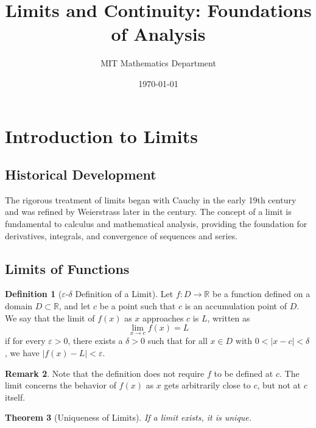 \documentclass[12pt,a4paper]{article}
\title{Limits and Continuity: Foundations of Analysis}
\author{MIT Mathematics Department}
\date{\today}
\theoremstyle{plain}
\newtheorem{theorem}{Theorem}[section]
\theoremstyle{definition}
\newtheorem{definition}[theorem]{Definition}
\newtheorem{remark}[theorem]{Remark}
\begin{document}
\maketitle
\tableofcontents
\newpage

\section{Introduction to Limits}

\subsection{Historical Development}

The rigorous treatment of limits began with Cauchy in the early 19th century and was refined by Weierstrass later in the century. The concept of a limit is fundamental to calculus and mathematical analysis, providing the foundation for derivatives, integrals, and convergence of sequences and series.

\subsection{Limits of Functions}

\begin{definition}[$\varepsilon$-$\delta$ Definition of a Limit]
Let $f: D \to \mathbb{R}$ be a function defined on a domain $D \subset \mathbb{R}$, and let $c$ be a point such that $c$ is an accumulation point of $D$. We say that the limit of $f(x)$ as $x$ approaches $c$ is $L$, written as
\begin{equation}
\lim_{x \to c} f(x) = L
\end{equation}
if for every $\varepsilon > 0$, there exists a $\delta > 0$ such that for all $x \in D$ with $0 < |x - c| < \delta$, we have $|f(x) - L| < \varepsilon$.
\end{definition}

\begin{remark}
Note that the definition does not require $f$ to be defined at $c$. The limit concerns the behavior of $f(x)$ as $x$ gets arbitrarily close to $c$, but not at $c$ itself.
\end{remark}

\begin{theorem}[Uniqueness of Limits]
If a limit exists, it is unique.
\end{theorem}
\end{document}

